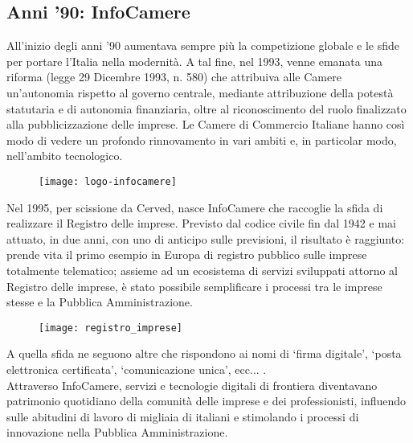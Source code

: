 	\subsection{Anni '90: InfoCamere}
	All'inizio degli anni '90 aumentava sempre più la competizione globale e le sfide per portare l'Italia nella modernità. A tal fine, nel 1993, venne emanata una riforma (legge 29 Dicembre 1993, n. 580) che attribuiva alle Camere un'autonomia rispetto al governo centrale, mediante attribuzione della potestà statutaria e di autonomia finanziaria, oltre al riconoscimento del ruolo finalizzato alla pubblicizzazione delle imprese. Le Camere di Commercio Italiane hanno così modo di vedere un profondo rinnovamento in vari ambiti e, in particolar modo, nell'ambito tecnologico.
	
	\begin{figure}[htbp]
		\begin{center}
			\texttt{[image: logo-infocamere]}
		\end{center}
	\end{figure}
	
	Nel 1995, per scissione da Cerved, nasce InfoCamere che raccoglie la sfida di realizzare il Registro delle imprese. Previsto dal codice civile fin dal 1942 e mai attuato, in due anni, con uno di anticipo sulle previsioni, il risultato è raggiunto: prende vita il primo esempio in Europa di registro pubblico sulle imprese  totalmente telematico; assieme ad un ecosistema di servizi sviluppati attorno al Registro delle imprese, è stato possibile semplificare i processi tra le imprese stesse e la Pubblica Amministrazione.
	
	\begin{figure}[htbp]
		\begin{center}
			\texttt{[image: registro\_imprese]}
		\end{center}
	\end{figure}
	
	A quella sfida ne seguono altre che rispondono ai nomi di ‘firma digitale’, ‘posta elettronica certificata’, ‘comunicazione unica’, ecc... . \\
	Attraverso InfoCamere, servizi e tecnologie digitali di frontiera diventavano patrimonio quotidiano della comunità delle imprese e dei professionisti, influendo sulle abitudini di lavoro di migliaia di italiani e stimolando i processi di innovazione nella Pubblica Amministrazione.


